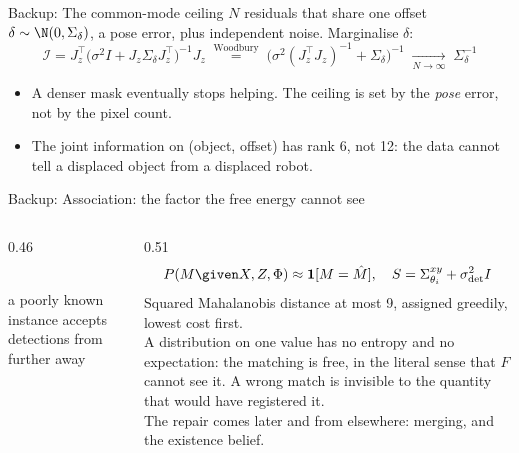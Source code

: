 
\begin{frame}{Backup: The common-mode ceiling}
  $N$ residuals that share one offset $\delta\sim\N(0,\Sigma_\delta)$, a pose error, plus independent
  noise. Marginalise $\delta$:
  \[
    \mathcal I = J_z^\top\big(\sigma^2 I + J_z\Sigma_\delta J_z^\top\big)^{-1}J_z
    \;\overset{\text{Woodbury}}{=}\;
    \big(\sigma^2(J_z^\top J_z)^{-1} + \Sigma_\delta\big)^{-1}
    \;\xrightarrow[N\to\infty]{}\; \Sigma_\delta^{-1}
  \]
  \begin{itemize}
    \item A denser mask eventually stops helping. The ceiling is set by the \emph{pose} error, not
          by the pixel count.
    \item The joint information on (object, offset) has rank 6, not 12: the data cannot tell a
          displaced object from a displaced robot.
  \end{itemize}
\end{frame}

\begin{frame}{Backup: Association: the factor the free energy cannot see}
  \begin{columns}[c]
    \begin{column}{0.46\textwidth}
      \centering
      \\[0.4em]
      {\small a poorly known instance accepts detections from further away}
    \end{column}
    \begin{column}{0.51\textwidth}
      \small
      \[
        P(M\given X,Z,\Phi)\approx\mathbf 1[M=\hat M],\quad
        S=\Sigma^{xy}_{\theta_i}+\sigma_\text{det}^2 I
      \]
      Squared Mahalanobis distance at most 9, assigned greedily, lowest cost first.\\[0.5em]
      A distribution on one value has no entropy and no expectation: the matching is free, in the
      literal sense that $F$ cannot see it. \alert{A wrong match is invisible to the quantity that
      would have registered it.}\\[0.5em]
      The repair comes later and from elsewhere: merging, and the existence belief.
    \end{column}
  \end{columns}
\end{frame}

